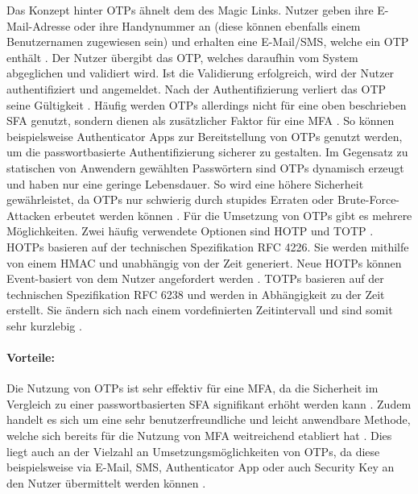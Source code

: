 Das Konzept hinter \ac{OTP}s ähnelt dem des Magic Links. Nutzer geben ihre E-Mail-Adresse oder ihre Handynummer an (diese können ebenfalls einem Benutzernamen zugewiesen sein) und erhalten eine E-Mail/SMS, welche ein \ac{OTP} enthält \cite{chowhan2019password} \cite{parmar2022comprehensive}. 
Der Nutzer übergibt das \ac{OTP}, welches daraufhin vom System abgeglichen und validiert wird. Ist die Validierung erfolgreich, wird der Nutzer authentifiziert und angemeldet. Nach der Authentifizierung verliert das \ac{OTP} seine Gültigkeit \cite{chowhan2019password}.
Häufig werden \ac{OTP}s allerdings nicht für eine oben beschrieben \ac{SFA} genutzt, sondern dienen als zusätzlicher Faktor für eine \ac{MFA} \cite{chowhan2019password}. So können beispielsweise Authenticator Apps zur Bereitstellung von \ac{OTP}s genutzt werden, um die passwortbasierte Authentifizierung sicherer zu gestalten.
Im Gegensatz zu statischen von Anwendern gewählten
Passwörtern sind \ac{OTP}s dynamisch erzeugt und haben nur
eine geringe Lebensdauer. So wird eine höhere
Sicherheit gewährleistet, da \ac{OTP}s nur schwierig durch
stupides Erraten oder Brute-Force-Attacken erbeutet
werden können \cite{chowhan2019password}.
Für die Umsetzung von \ac{OTP}s gibt es mehrere Möglichkeiten. Zwei häufig verwendete Optionen sind \ac{HOTP} und \ac{TOTP} \cite{chowhan2019password}.
\ac{HOTP}s basieren auf der technischen Spezifikation RFC 4226. Sie werden mithilfe von einem \ac{HMAC} und unabhängig von der Zeit generiert. Neue \ac{HOTP}s können Event-basiert von dem Nutzer angefordert werden \cite{chowhan2019password}.
\ac{TOTP}s basieren auf der technischen Spezifikation RFC 6238 und werden in Abhängigkeit zu der Zeit erstellt. Sie ändern sich nach einem vordefinierten Zeitintervall und sind somit sehr kurzlebig \cite{chowhan2019password}.

\paragraph*{Vorteile:} Die Nutzung von \ac{OTP}s ist sehr effektiv für eine \ac{MFA}, da die Sicherheit im Vergleich zu einer passwortbasierten \ac{SFA} signifikant erhöht werden kann \cite{chowhan2019password} \cite{parmar2022comprehensive}. Zudem handelt es sich um eine sehr benutzerfreundliche und leicht anwendbare Methode, welche sich bereits für die Nutzung von \ac{MFA} weitreichend etabliert hat \cite{parmar2022comprehensive}. Dies liegt auch an der Vielzahl an Umsetzungsmöglichkeiten von \ac{OTP}s, da diese beispielsweise via E-Mail, SMS, Authenticator App oder auch Security Key an den Nutzer übermittelt werden können \cite{chowhan2019password} \cite{parmar2022comprehensive}. 

